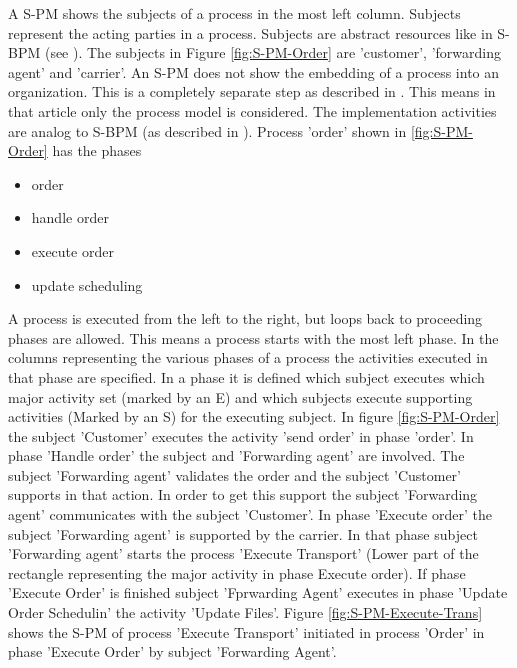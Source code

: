 A S-PM shows the subjects of a process in the most left column. Subjects  represent the acting parties in a process. Subjects are abstract resources like in S-BPM (see \cite{book:flei2011}). The subjects in Figure \ref{fig:S-PM-Order} are 'customer', 'forwarding agent' and 'carrier'. An S-PM does not show the embedding of a process into an organization. This is a completely separate step as described in \cite{book:flei2011}. This means in that article only the process model is considered. The implementation activities are analog to S-BPM (as described in \cite{book:flei2011}).
Process 'order' shown in \ref{fig:S-PM-Order} has the phases 
\begin{itemize}
	\item order 
	\item handle order
	\item execute order
	\item update scheduling
\end{itemize}
A process is executed from the left to the right, but loops back to proceeding phases are allowed. This means a process starts with the most left phase. In the columns representing the various phases of a process the activities executed in that phase are specified. In a phase it is defined which subject executes which major activity set (marked by an E) and which subjects execute supporting activities (Marked by an S) for the executing subject. In figure \ref{fig:S-PM-Order} the subject 'Customer' executes the activity 'send order' in phase 'order'. In phase 'Handle order' the subject and 'Forwarding agent' are involved. The subject 'Forwarding agent' validates the order and the subject 'Customer' supports in that action. In order to get this support the subject 'Forwarding agent' communicates with the subject 'Customer'. In phase 'Execute order' the subject 'Forwarding agent' is supported by the carrier. In that phase subject 'Forwarding agent' starts the process 'Execute Transport' (Lower part of the rectangle representing the major activity in phase Execute order). If phase 'Execute Order' is finished subject 'Fprwarding Agent' executes in phase 'Update Order Schedulin' the activity 'Update Files'. Figure \ref{fig:S-PM-Execute-Trans} shows the S-PM of process 'Execute Transport' initiated in process 'Order' in phase 'Execute Order' by subject 'Forwarding Agent'.

